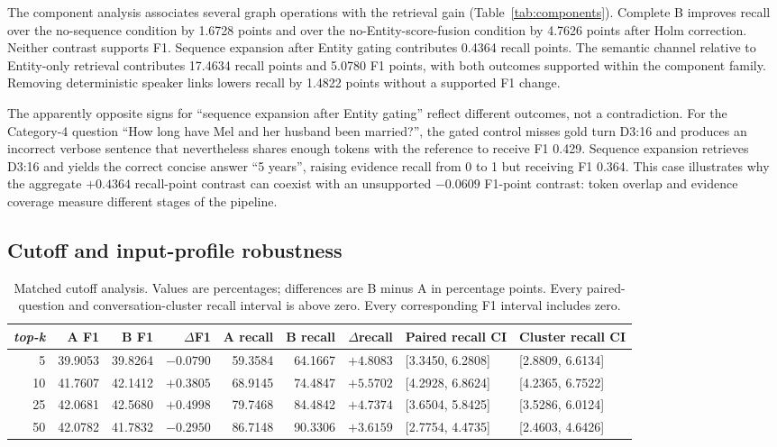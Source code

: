 \documentclass[10pt,twocolumn]{article}
\newcommand{\topk}{\textit{top-k}}
\begin{document}
The component analysis associates several graph operations with the retrieval gain
(Table~\ref{tab:components}). Complete B improves recall over the no-sequence
condition by 1.6728 points and over the no-Entity-score-fusion condition by
4.7626 points after Holm correction. Neither contrast supports F1. Sequence
expansion after Entity gating contributes 0.4364 recall points. The semantic
channel relative to Entity-only retrieval contributes 17.4634 recall points
and 5.0780 F1 points, with both outcomes supported within the component
family. Removing deterministic speaker links lowers recall by 1.4822 points
without a supported F1 change.

The apparently opposite signs for ``sequence expansion after Entity gating''
reflect different outcomes, not a contradiction. For the Category-4 question
``How long have Mel and her husband been married?'', the gated control misses
gold turn D3:16 and produces an incorrect verbose sentence that nevertheless
shares enough tokens with the reference to receive F1 0.429. Sequence
expansion retrieves D3:16 and yields the correct concise answer ``5 years'',
raising evidence recall from 0 to 1 but receiving F1 0.364. This case
illustrates why the aggregate $+0.4364$ recall-point contrast can coexist with
an unsupported $-0.0609$ F1-point contrast: token overlap and evidence
coverage measure different stages of the pipeline.

\subsection{Cutoff and input-profile robustness}

\begin{table}[t]
\centering
\caption{Matched cutoff analysis. Values are percentages; differences are
B minus A in percentage points. Every paired-question and
conversation-cluster recall interval is above zero. Every corresponding F1
interval includes zero.}
\label{tab:cutoffs}
\begin{tabular}{@{}rrrrrrrll@{}}
\toprule
\topk{} & A F1 & B F1 & \(\Delta\)F1 & A recall & B recall &
\(\Delta\)recall & Paired recall CI & Cluster recall CI \\
\midrule
5  & 39.9053 & 39.8264 & \(-0.0790\) & 59.3584 & 64.1667 & \(+4.8083\) & [3.3450, 6.2808] & [2.8809, 6.6134] \\
10 & 41.7607 & 42.1412 & \(+0.3805\) & 68.9145 & 74.4847 & \(+5.5702\) & [4.2928, 6.8624] & [4.2365, 6.7522] \\
25 & 42.0681 & 42.5680 & \(+0.4998\) & 79.7468 & 84.4842 & \(+4.7374\) & [3.6504, 5.8425] & [3.5286, 6.0124] \\
50 & 42.0782 & 41.7832 & \(-0.2950\) & 86.7148 & 90.3306 & \(+3.6159\) & [2.7754, 4.4735] & [2.4603, 4.6426] \\
\bottomrule
\end{tabular}
\end{table}
\end{document}
